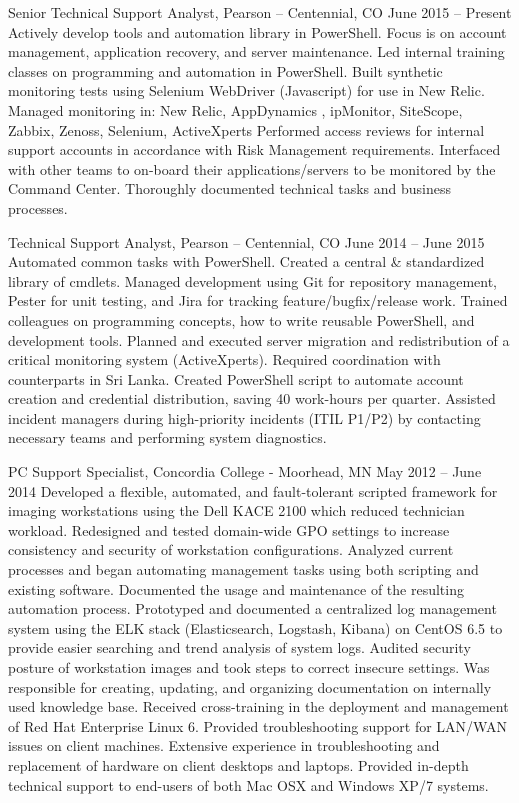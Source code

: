Senior Technical Support Analyst, Pearson – Centennial, CO
June 2015 – Present
Actively develop tools and automation library in PowerShell. Focus is on account management, application recovery, and server maintenance.
Led internal training classes on programming and automation in PowerShell.
Built synthetic monitoring tests using Selenium WebDriver (Javascript) for use in New Relic.
Managed monitoring in: New Relic, AppDynamics , ipMonitor, SiteScope, Zabbix, Zenoss, Selenium, ActiveXperts
Performed access reviews for internal support accounts in accordance with Risk Management requirements.
Interfaced with other teams to on-board their applications/servers to be monitored by the Command Center.
Thoroughly documented technical tasks and business processes.

Technical Support Analyst, Pearson – Centennial, CO
June 2014 – June 2015
Automated common tasks with PowerShell. Created a central & standardized library of cmdlets. Managed development using Git for repository management, Pester for unit testing, and Jira for tracking feature/bugfix/release work.
Trained colleagues on programming concepts, how to write reusable PowerShell, and development tools.
Planned and executed server migration and redistribution of a critical monitoring system (ActiveXperts). Required coordination with counterparts in Sri Lanka.
Created PowerShell script to automate account creation and credential distribution, saving 40 work-hours per quarter.
Assisted incident managers during high-priority incidents (ITIL P1/P2) by contacting necessary teams and performing system diagnostics.

PC Support Specialist, Concordia College - Moorhead, MN
May 2012 – June 2014
Developed a flexible, automated, and fault-tolerant scripted framework for imaging workstations using the Dell KACE 2100 which reduced technician workload.
Redesigned and tested domain-wide GPO settings to increase consistency and security of workstation configurations.
Analyzed current processes and began automating management tasks using both scripting and existing software. Documented the usage and maintenance of the resulting automation process.
Prototyped and documented a centralized log management system using the ELK stack (Elasticsearch, Logstash, Kibana) on CentOS 6.5 to provide easier searching and trend analysis of system logs.
Audited security posture of workstation images and took steps to correct insecure settings.
Was responsible for creating, updating, and organizing documentation on internally used knowledge base.
Received cross-training in the deployment and management of Red Hat Enterprise Linux 6.
Provided troubleshooting support for LAN/WAN issues on client machines.
Extensive experience in troubleshooting and replacement of hardware on client desktops and laptops.
Provided in-depth technical support to end-users of both Mac OSX and Windows XP/7 systems.

